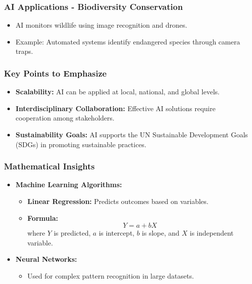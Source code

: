 \documentclass[aspectratio=169]{beamer}
\begin{document}
\begin{frame}[fragile]
    \frametitle{AI Applications - Biodiversity Conservation}
    \begin{itemize}
        \item AI monitors wildlife using image recognition and drones.
        \item Example: Automated systems identify endangered species through camera traps.
    \end{itemize}
\end{frame}

\begin{frame}[fragile]
    \frametitle{Key Points to Emphasize}
    \begin{itemize}
        \item \textbf{Scalability:} AI can be applied at local, national, and global levels.
        \item \textbf{Interdisciplinary Collaboration:} Effective AI solutions require cooperation among stakeholders.
        \item \textbf{Sustainability Goals:} AI supports the UN Sustainable Development Goals (SDGs) in promoting sustainable practices.
    \end{itemize}
\end{frame}

\begin{frame}[fragile]
    \frametitle{Mathematical Insights}
    \begin{itemize}
        \item \textbf{Machine Learning Algorithms:}
            \begin{itemize}
                \item \textbf{Linear Regression:} Predicts outcomes based on variables.
                \item \textbf{Formula:}
                    \begin{equation}
                    Y = a + bX
                    \end{equation}
                    where \(Y\) is predicted, \(a\) is intercept, \(b\) is slope, and \(X\) is independent variable.
            \end{itemize}
        \item \textbf{Neural Networks:} 
            \begin{itemize}
                \item Used for complex pattern recognition in large datasets.
            \end{itemize}
    \end{itemize}
\end{frame}
\end{document}
